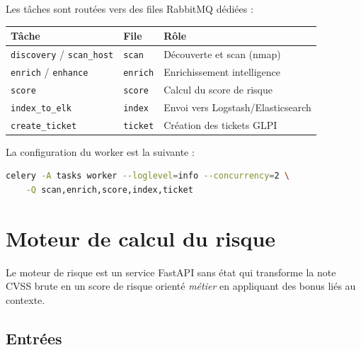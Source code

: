 Les t\^aches sont rout\'ees vers des files RabbitMQ d\'edi\'ees :

\begin{center}
\small
\begin{tabularx}{\linewidth}{@{}l l X@{}}
\toprule
\textbf{T\^ache} & \textbf{File} & \textbf{R\^ole} \\
\midrule
\texttt{discovery} / \texttt{scan\_host} & \texttt{scan} & D\'ecouverte et scan (nmap) \\
\texttt{enrich} / \texttt{enhance} & \texttt{enrich} & Enrichissement intelligence \\
\texttt{score} & \texttt{score} & Calcul du score de risque \\
\texttt{index\_to\_elk} & \texttt{index} & Envoi vers Logstash/Elasticsearch \\
\texttt{create\_ticket} & \texttt{ticket} & Cr\'eation des tickets GLPI \\
\bottomrule
\end{tabularx}
\end{center}

La configuration du worker est la suivante :

\begin{lstlisting}[language=bash,caption={Commande du worker Celery}]
celery -A tasks worker --loglevel=info --concurrency=2 \
    -Q scan,enrich,score,index,ticket
\end{lstlisting}

\clearpage

\section{Moteur de calcul du risque}

Le moteur de risque est un service FastAPI sans \'etat qui transforme la note
CVSS brute en un score de risque orient\'e \emph{m\'etier} en appliquant des
bonus li\'es au contexte.

\subsection{Entr\'ees}

